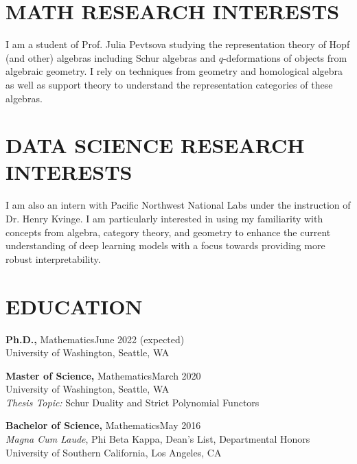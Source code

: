 \documentclass[margin]{res} %
\begin{document}
\begin{resume}

 
\section{MATH RESEARCH INTERESTS}  

I am a student of Prof. Julia Pevtsova studying the representation theory of Hopf (and other) algebras
including Schur algebras and $q$-deformations of objects from algebraic geometry. I rely on techniques from 
geometry and homological algebra as well as support theory to understand the representation categories of 
these algebras.

\section{DATA SCIENCE RESEARCH INTERESTS}

I am also an intern with Pacific Northwest National Labs under the instruction of Dr. Henry Kvinge. 
I am particularly interested in using my familiarity with concepts from algebra, category theory, and geometry
to enhance the current understanding of deep learning models with a focus towards providing more robust interpretability.


\section{EDUCATION}

{\bf Ph.D.,} Mathematics\hfill June 2022 (expected) \\
University of Washington, Seattle, WA

{\bf Master of Science,} Mathematics\hfill March 2020 \\
University of Washington, Seattle, WA \\
{\it Thesis Topic:} Schur Duality and Strict Polynomial Functors

{\bf Bachelor of Science,} Mathematics\hfill May 2016 \\
{\sl Magna Cum Laude}, Phi Beta Kappa, Dean's List, Departmental Honors \\
University of Southern California, Los Angeles, CA 


\end{resume}
\end{document}
